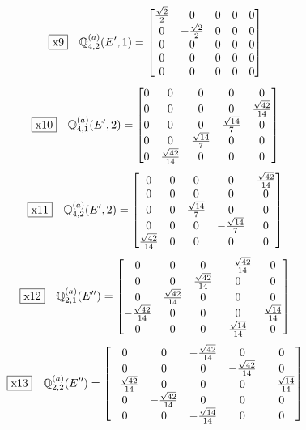 \documentclass[fleqn,10pt,landscape]{jsarticle}
\begin{document}
\begin{dmath*}
\fbox{x9}\quad \mathbb{Q}_{4,2}^{(a)}(E^{\prime},1)=\begin{bmatrix} \frac{\sqrt{2}}{2} & 0 & 0 & 0 & 0 \\ 0 & - \frac{\sqrt{2}}{2} & 0 & 0 & 0 \\ 0 & 0 & 0 & 0 & 0 \\ 0 & 0 & 0 & 0 & 0 \\ 0 & 0 & 0 & 0 & 0 \end{bmatrix}
\end{dmath*}
\begin{dmath*}
\fbox{x10}\quad \mathbb{Q}_{4,1}^{(a)}(E^{\prime},2)=\begin{bmatrix} 0 & 0 & 0 & 0 & 0 \\ 0 & 0 & 0 & 0 & \frac{\sqrt{42}}{14} \\ 0 & 0 & 0 & \frac{\sqrt{14}}{7} & 0 \\ 0 & 0 & \frac{\sqrt{14}}{7} & 0 & 0 \\ 0 & \frac{\sqrt{42}}{14} & 0 & 0 & 0 \end{bmatrix}
\end{dmath*}
\begin{dmath*}
\fbox{x11}\quad \mathbb{Q}_{4,2}^{(a)}(E^{\prime},2)=\begin{bmatrix} 0 & 0 & 0 & 0 & \frac{\sqrt{42}}{14} \\ 0 & 0 & 0 & 0 & 0 \\ 0 & 0 & \frac{\sqrt{14}}{7} & 0 & 0 \\ 0 & 0 & 0 & - \frac{\sqrt{14}}{7} & 0 \\ \frac{\sqrt{42}}{14} & 0 & 0 & 0 & 0 \end{bmatrix}
\end{dmath*}
\begin{dmath*}
\fbox{x12}\quad \mathbb{Q}_{2,1}^{(a)}(E^{\prime\prime})=\begin{bmatrix} 0 & 0 & 0 & - \frac{\sqrt{42}}{14} & 0 \\ 0 & 0 & \frac{\sqrt{42}}{14} & 0 & 0 \\ 0 & \frac{\sqrt{42}}{14} & 0 & 0 & 0 \\ - \frac{\sqrt{42}}{14} & 0 & 0 & 0 & \frac{\sqrt{14}}{14} \\ 0 & 0 & 0 & \frac{\sqrt{14}}{14} & 0 \end{bmatrix}
\end{dmath*}
\begin{dmath*}
\fbox{x13}\quad \mathbb{Q}_{2,2}^{(a)}(E^{\prime\prime})=\begin{bmatrix} 0 & 0 & - \frac{\sqrt{42}}{14} & 0 & 0 \\ 0 & 0 & 0 & - \frac{\sqrt{42}}{14} & 0 \\ - \frac{\sqrt{42}}{14} & 0 & 0 & 0 & - \frac{\sqrt{14}}{14} \\ 0 & - \frac{\sqrt{42}}{14} & 0 & 0 & 0 \\ 0 & 0 & - \frac{\sqrt{14}}{14} & 0 & 0 \end{bmatrix}
\end{dmath*}
\end{document}
